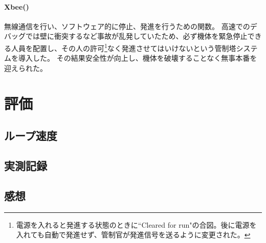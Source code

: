 \documentclass{ltjsreport}
\begin{document}
\subsubsection{Xbee()}
無線通信を行い、ソフトウェア的に停止、発進を行うための関数。
高速でのデバッグでは壁に衝突するなど事故が乱発していたため、必ず機体を緊急停止できる人員を配置し、その人の許可\footnote{電源を入れると発進する状態のときに``Cleared for run"の合図。後に電源を入れても自動で発進せず、管制官が発進信号を送るように変更された。}なく発進させてはいけないという管制塔システムを導入した。
その結果安全性が向上し、機体を破壊することなく無事本番を迎えられた。




\chapter{評価}\label{cha:eval}

\section{ループ速度}


\section{実測記録}


\section{感想}


















\appendix


\end{document}
